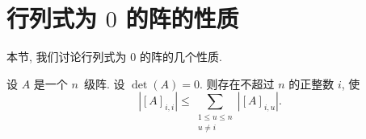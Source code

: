 \documentclass[../libro.tex]{subfiles}
\begin{document}
\section{\texorpdfstring{行列式为 \(0\) 的阵的性质}%
{行列式为 0 的阵的性质}}

本节, 我们讨论行列式为 \(0\) 的阵的几个性质.

\begin{theorem}
    设 \(A\) 是一个 \(n\)~级阵.
    设 \(\det {(A)} = 0\).
    则存在不超过 \(n\) 的正整数 \(i\), 使
    \begin{equation}
        |[A]_{i,i}| \leq
        \sum_{\substack{1 \leq u \leq n \\
        u \neq i}} {|[A]_{i,u}|}.
        \label{eq:NonzeroDet1}
    \end{equation}
\end{theorem}
\end{document}
